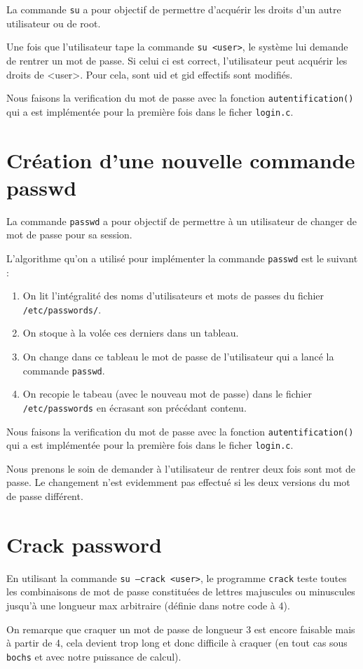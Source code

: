 \documentclass[a4paper,11pt,french]{article}
\begin{document}
La commande \texttt{su} a pour objectif de permettre d'acquérir les droits d'un autre utilisateur ou de root.

Une fois que l'utilisateur tape la commande \texttt{su <user>}, le système lui demande de rentrer un mot de passe. Si celui ci est correct, l'utilisateur peut acquérir les droits de <user>. Pour cela, sont uid et gid effectifs sont modifiés.

Nous faisons la verification du mot de passe avec la fonction \texttt{autentification()} qui a est implémentée pour la première fois dans le ficher \texttt{login.c}.

\section{Création d'une nouvelle commande passwd}

La commande \texttt{passwd} a pour objectif de permettre à un utilisateur de changer de mot de passe pour sa session.

L'algorithme qu'on a utilisé pour implémenter la commande \texttt{passwd} est le suivant :
\begin{enumerate}
	\item On lit l'intégralité des noms d'utilisateurs et mots de passes du fichier \texttt{/etc/passwords/}.
	\item On stoque à la volée ces derniers dans un tableau.
	\item On change dans ce tableau le mot de passe de l'utilisateur qui a lancé la commande \texttt{passwd}.
	\item On recopie le tabeau (avec le nouveau mot de passe) dans le fichier \texttt{/etc/passwords} en écrasant son précédant contenu.
\end{enumerate}

Nous faisons la verification du mot de passe avec la fonction \texttt{autentification()} qui a est implémentée pour la première fois dans le ficher \texttt{login.c}.

Nous prenons le soin de demander à l'utilisateur de rentrer deux fois sont mot de passe. Le changement n'est evidemment pas effectué si les deux versions du mot de passe différent.

\section{Crack password}

En utilisant la commande \texttt{su --crack <user>}, le programme \texttt{crack} teste toutes les combinaisons de mot de passe constituées de lettres majuscules ou minuscules jusqu'à une longueur max arbitraire (définie dans notre code à 4).

On remarque que craquer un mot de passe de longueur 3 est encore faisable mais à partir de 4, cela devient trop long et donc difficile à craquer (en tout cas sous \texttt{bochs} et avec notre puissance de calcul).
\end{document}
